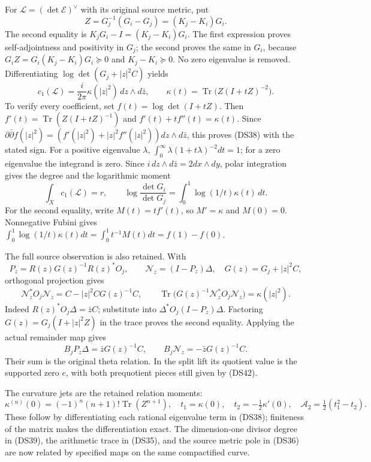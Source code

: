 \documentclass{article}
\begin{document}
For $\mathscr L=(\det\mathscr E)^\vee$ with its original source metric,
put
\[
 Z=G_j^{-1}(G_i-G_j)=(K_j-K_i)G_i.
 \tag{DS37}
\]
The second equality is $K_jG_i-I=(K_j-K_i)G_i$.
The first expression proves self-adjointness and positivity in $G_j$;
the second proves the same in $G_i$, because
$G_iZ=G_i(K_j-K_i)G_i\succeq0$ and $K_j-K_i\succeq0$.
No zero eigenvalue is removed.  Differentiating
$\log\det(G_j+|z|^2C)$ yields
\[
 c_1(\mathscr L)=\frac{i}{2\pi}\kappa(|z|^2)\,dz\wedge d\bar z,
 \qquad \kappa(t)=\operatorname{Tr}\bigl(Z(I+tZ)^{-2}\bigr).
 \tag{DS38}
\]
To verify every coefficient, set $f(t)=\log\det(I+tZ)$.
Then $f'(t)=\operatorname{Tr}(Z(I+tZ)^{-1})$ and
$f'(t)+tf''(t)=\kappa(t)$.  Since
$\partial\bar\partial f(|z|^2)=(f'(|z|^2)+|z|^2f''(|z|^2))
dz\wedge d\bar z$, this proves (DS38) with the stated sign.
For a positive eigenvalue $\lambda$,
$\int_0^\infty\lambda(1+t\lambda)^{-2}dt=1$; for a zero eigenvalue
the integrand is zero.  Since $i\,dz\wedge d\bar z=2dx\wedge dy$,
polar integration gives the degree and the logarithmic moment
\[
 \int_X c_1(\mathscr L)=r,\qquad
 \log\frac{\det G_i}{\det G_j}
 =\int_0^1\log(1/t)\kappa(t)\,dt.
 \tag{DS39}
\]
For the second equality, write $M(t)=tf'(t)$, so $M'=\kappa$ and
$M(0)=0$.  Nonnegative Fubini gives
$\int_0^1\log(1/t)\kappa(t)dt
=\int_0^1t^{-1}M(t)dt=f(1)-f(0)$.

The full source observation is also retained.  With
\[
 P_z=R(z)G(z)^{-1}R(z)^*O_j,
 \qquad\mathcal N_z=(I-P_z)\Delta,
 \quad G(z)=G_j+|z|^2C,
 \tag{DS40}
\]
orthogonal projection gives
\[
 \mathcal N_z^*O_j\mathcal N_z=C-|z|^2CG(z)^{-1}C,
 \qquad\operatorname{Tr}\bigl(G(z)^{-1}\mathcal N_z^*O_j\mathcal N_z\bigr)
 =\kappa(|z|^2).
 \tag{DS41}
\]
Indeed $R(z)^*O_j\Delta=\bar zC$; substitute into
$\Delta^*O_j(I-P_z)\Delta$.  Factoring
$G(z)=G_j(I+|z|^2Z)$ in the trace proves the second equality.
Applying the actual remainder map gives
\[
 B_jP_z\Delta=\bar zG(z)^{-1}C,
 \qquad B_j\mathcal N_z=-\bar zG(z)^{-1}C.
 \tag{DS42}
\]
Their sum is the original theta relation.  In the split lift its
quotient value is the supported zero $e$, with both prequotient
pieces still given by (DS42).

The curvature jets are the retained relation moments:
\[
 \kappa^{(n)}(0)=(-1)^n(n+1)!\operatorname{Tr}(Z^{n+1}),
 \quad t_1=\kappa(0),\quad t_2=-\tfrac12\kappa'(0),
 \quad\mathcal A_2=\tfrac12(t_1^2-t_2).
 \tag{DS43}
\]
These follow by differentiating each rational eigenvalue term in
(DS38); finiteness of the matrix makes the differentiation exact.
The dimension-one divisor degree in (DS39), the arithmetic trace in
(DS35), and the source metric pole in (DS36) are now related by
specified maps on the same compactified curve.
\end{document}
